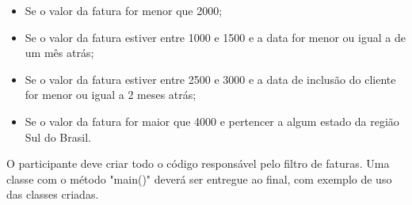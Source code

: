 \begin{itemize}
	\item Se o valor da fatura for menor que 2000;
	\item Se o valor da fatura estiver entre 1000 e 1500 e a data for menor ou igual a de um mês atrás;
	\item Se o valor da fatura estiver entre 2500 e 3000 e a data de inclusão do cliente for menor ou igual a 2 meses atrás;
	\item Se o valor da fatura for maior que 4000 e pertencer a algum estado da região Sul do Brasil.
\end{itemize}

O participante deve criar todo o código responsável pelo filtro de faturas.
Uma classe com o método "main()" deverá ser entregue ao final, com exemplo 
de uso das classes criadas.